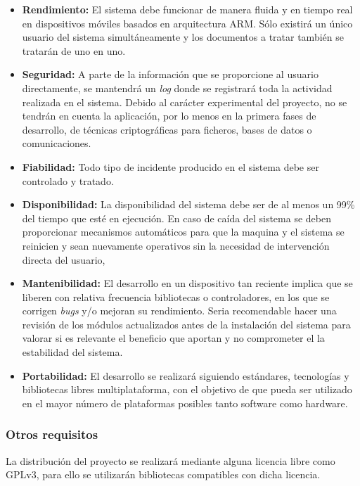 \begin{itemize}
\item\textbf{Rendimiento:} El sistema debe funcionar de manera fluida y en tiempo real en dispositivos móviles basados en arquitectura ARM. Sólo existirá un único usuario del sistema simultáneamente y los documentos a tratar también se tratarán de uno en uno.

\item\textbf{Seguridad:} A parte de la información que se proporcione al usuario directamente, se mantendrá un \textit{log} donde se registrará toda la actividad realizada en el sistema.
Debido al carácter experimental del proyecto, no se tendrán en cuenta la aplicación, por lo menos en la primera fases de desarrollo, de técnicas criptográficas para ficheros, bases de datos o comunicaciones.

\item\textbf{Fiabilidad:} Todo tipo de incidente producido en el sistema debe ser controlado y tratado. 

\item\textbf{Disponibilidad:} La disponibilidad del sistema debe ser de al menos un 99\% del tiempo que esté en ejecución. En caso de caída del sistema se deben proporcionar mecanismos automáticos para que la maquina y el sistema se reinicien y sean nuevamente operativos sin la necesidad de intervención directa del usuario,

\item\textbf{Mantenibilidad:} El desarrollo en un dispositivo tan reciente implica que se liberen con relativa frecuencia bibliotecas o controladores, en los que se corrigen \textit{bugs} y/o mejoran su rendimiento. Seria recomendable hacer una revisión de los módulos actualizados antes de la instalación del sistema para valorar si es relevante el beneficio que aportan y no comprometer el la estabilidad del sistema.  

\item\textbf{Portabilidad:} El desarrollo se  realizará siguiendo estándares, tecnologías y bibliotecas libres multiplataforma, con el objetivo de que pueda ser utilizado en el mayor número de plataformas posibles tanto software como hardware.
\end{itemize}

\subsubsection{Otros requisitos}
La distribución del proyecto se realizará mediante alguna licencia libre como GPLv3, para ello se utilizarán bibliotecas compatibles con dicha licencia.

